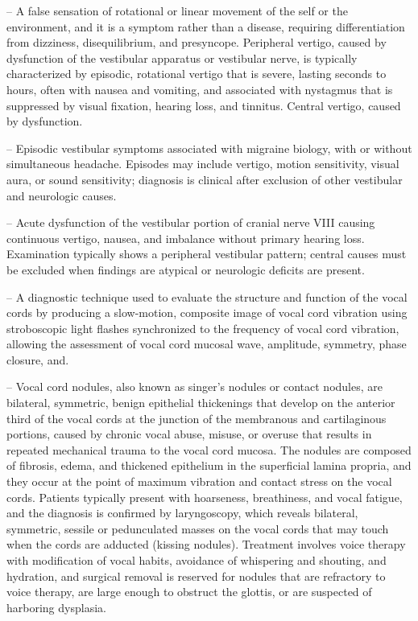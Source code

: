 -- A false sensation of rotational or linear movement of the self or the environment, and it is a symptom rather than a disease, requiring differentiation from dizziness, disequilibrium, and presyncope. Peripheral vertigo, caused by dysfunction of the vestibular apparatus or vestibular nerve, is typically characterized by episodic, rotational vertigo that is severe, lasting seconds to hours, often with nausea and vomiting, and associated with nystagmus that is suppressed by visual fixation, hearing loss, and tinnitus. Central vertigo, caused by dysfunction.

-- Episodic vestibular symptoms associated with migraine biology, with or without simultaneous headache. Episodes may include vertigo, motion sensitivity, visual aura, or sound sensitivity; diagnosis is clinical after exclusion of other vestibular and neurologic causes.

-- Acute dysfunction of the vestibular portion of cranial nerve VIII causing continuous vertigo, nausea, and imbalance without primary hearing loss. Examination typically shows a peripheral vestibular pattern; central causes must be excluded when findings are atypical or neurologic deficits are present.

-- A diagnostic technique used to evaluate the structure and function of the vocal cords by producing a slow-motion, composite image of vocal cord vibration using stroboscopic light flashes synchronized to the frequency of vocal cord vibration, allowing the assessment of vocal cord mucosal wave, amplitude, symmetry, phase closure, and.

-- Vocal cord nodules, also known as singer’s nodules or contact nodules, are bilateral, symmetric, benign epithelial thickenings that develop on the anterior third of the vocal cords at the junction of the membranous and cartilaginous portions, caused by chronic vocal abuse, misuse, or overuse that results in repeated mechanical trauma to the vocal cord mucosa. The nodules are composed of fibrosis, edema, and thickened epithelium in the superficial lamina propria, and they occur at the point of maximum vibration and contact stress on the vocal cords. Patients typically present with hoarseness, breathiness, and vocal fatigue, and the diagnosis is confirmed by laryngoscopy, which reveals bilateral, symmetric, sessile or pedunculated masses on the vocal cords that may touch when the cords are adducted (kissing nodules). Treatment involves voice therapy with modification of vocal habits, avoidance of whispering and shouting, and hydration, and surgical removal is reserved for nodules that are refractory to voice therapy, are large enough to obstruct the glottis, or are suspected of harboring dysplasia.

